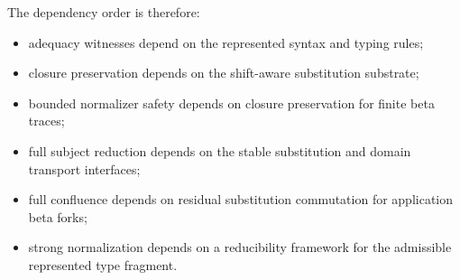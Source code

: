 The dependency order is therefore:

\begin{itemize}
  \item adequacy witnesses depend on the represented syntax and typing rules;
  \item closure preservation depends on the shift-aware substitution substrate;
  \item bounded normalizer safety depends on closure preservation for finite
    beta traces;
  \item full subject reduction depends on the stable substitution and domain
    transport interfaces;
  \item full confluence depends on residual substitution commutation for
    application beta forks;
  \item strong normalization depends on a reducibility framework for the
    admissible represented type fragment.
\end{itemize}
